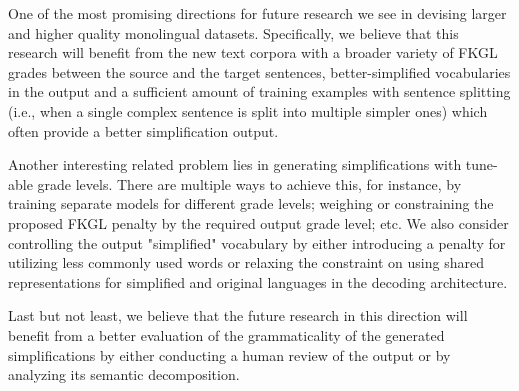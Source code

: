 One of the most promising directions for future research we see in devising larger and higher quality monolingual datasets. Specifically, we believe that this research will benefit from the new text corpora with a broader variety of FKGL grades between the source and the target sentences, better-simplified vocabularies in the output and a sufficient amount of training examples with sentence splitting (i.e., when a single complex sentence is split into multiple simpler ones) which often provide a better simplification output.      

Another interesting related problem lies in generating simplifications with tune-able grade levels. There are multiple ways to achieve this, for instance, by training separate models for different grade levels; weighing or constraining the proposed FKGL penalty by the required output grade level; etc. We also consider controlling the output "simplified" vocabulary by either introducing a penalty for utilizing less commonly used words or relaxing the constraint on using shared representations for simplified and original languages in the decoding architecture. 

Last but not least, we believe that the future research in this direction will benefit from a better evaluation of the grammaticality of the generated simplifications by either conducting a human review of the output or by analyzing its semantic decomposition.  





\endinput